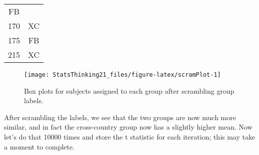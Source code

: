 \documentclass[]{book}
\theoremstyle{definition}
\theoremstyle{definition}
\theoremstyle{definition}
\theoremstyle{remark}
\begin{document}
\begin{longtable}[]{@{}cc@{}}
\begin{minipage}[t]{0.21\columnwidth}
FB\strut
\end{minipage}\tabularnewline
\begin{minipage}[t]{0.10\columnwidth}\centering\strut
170\strut
\end{minipage} & \begin{minipage}[t]{0.21\columnwidth}\centering\strut
XC\strut
\end{minipage}\tabularnewline
\begin{minipage}[t]{0.10\columnwidth}\centering\strut
175\strut
\end{minipage} & \begin{minipage}[t]{0.21\columnwidth}\centering\strut
FB\strut
\end{minipage}\tabularnewline
\begin{minipage}[t]{0.10\columnwidth}\centering\strut
215\strut
\end{minipage} & \begin{minipage}[t]{0.21\columnwidth}\centering\strut
XC\strut
\end{minipage}\tabularnewline
\bottomrule
\end{longtable}

\begin{figure}
\texttt{[image: StatsThinking21\_files/figure-latex/scramPlot-1]} \caption{Box plots for subjects assigned to each group after scrambling group labels.}\label{fig:scramPlot}
\end{figure}

After scrambling the labels, we see that the two groups are now much
more similar, and in fact the cross-country group now has a slightly
higher mean. Now let's do that 10000 times and store the t statistic for
each iteration; this may take a moment to complete.
\end{document}
